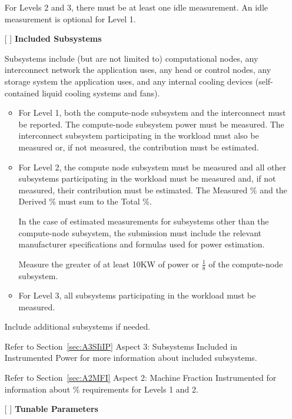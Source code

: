 \begin{itemize}
For Levels 2 and 3, there must be at least one idle measurement. An idle measurement is optional for Level 1. 

\newpage
\item[{[ ]}]
\textbf{Included Subsystems}

Subsystems include (but are not limited to) computational nodes, any interconnect network the application uses, any head or control nodes, any storage system the application uses, and any internal cooling devices (self-contained liquid cooling systems and fans).  

\begin{itemize}
\item
For Level 1, both the compute-node subsystem and the interconnect must be reported.  
The compute-node subsystem power must be measured. 
The interconnect subsystem participating in the workload must also be measured or, if not measured, the contribution must be estimated.


\item
For Level 2, the compute node subsystem must be measured and all other subsystems participating in the workload must be measured and, if not measured, their contribution must be estimated. The Measured \% and the Derived \% must sum to the Total \%.

In the case of estimated measurements for subsystems other than 
the compute-node subsystem, the submission must include the relevant 
manufacturer specifications and formulas used for power estimation. 

Measure the greater of at least 10KW of power or $ \frac{1}{8} $ of the compute-node subsystem.

\item
For Level 3, all subsystems participating in the workload must be measured.
\end{itemize}

Include additional subsystems if needed.

Refer to Section~\ref{sec:A3SIiIP} Aspect 3: Subsystems Included in Instrumented Power for more information about included subsystems.

Refer to Section~\ref{sec:A2MFI} Aspect 2: Machine Fraction Instrumented for information about \% requirements for Levels 1 and 2.
 
\item[{[ ]}]
\textbf{Tunable Parameters}


\end{itemize}
